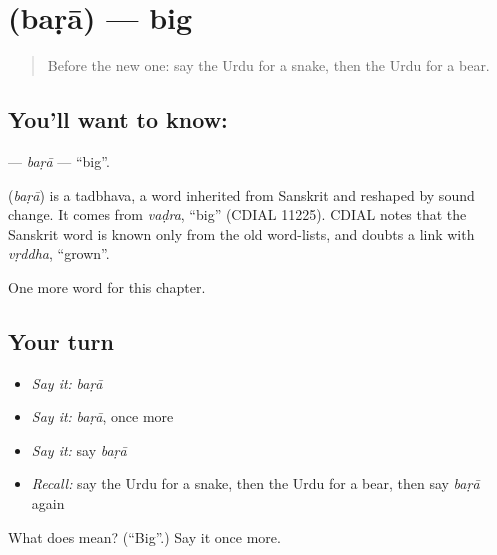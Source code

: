 \section[\texorpdfstring{\ur{بڑا} (baṛā)}{بڑا (baṛā)}]{ (baṛā) — big}

\label{lesson:UR-C69-bara}



\begin{quote}
Before the new one: say the Urdu for a snake, then the Urdu for a bear.
\end{quote}

\subsection*{You'll want to know: }
\textbf{} — \emph{baṛā} — \textquotedblleft{}big\textquotedblright{}.

\begin{cousinweb}
\textbf{} (\emph{baṛā}) is a tadbhava, a word inherited from Sanskrit and reshaped by sound change. It comes from \emph{vaḍra}, \textquotedblleft{}big\textquotedblright{} (CDIAL 11225). CDIAL notes that the Sanskrit word is known only from the old word-lists, and doubts a link with \emph{vṛddha}, \textquotedblleft{}grown\textquotedblright{}.
\end{cousinweb}

\begin{grammarlens}[title={What you've built}]
One more word for this chapter.
\end{grammarlens}

\subsection*{Your turn}
\begin{itemize}
\raggedright
  \item \emph{Say it:} \emph{baṛā}
  \item \emph{Say it:} \emph{baṛā}, once more
  \item \emph{Say it:} say \emph{baṛā}
  \item \emph{Recall:} say the Urdu for a snake, then the Urdu for a bear, then say \emph{baṛā} again
\end{itemize}

\begin{tcolorbox}[breakable,colback=teal!4,colframe=teal!35!black,title={Before you move on}]
What does  mean? (\textquotedblleft{}Big\textquotedblright{}.) Say it once more.
\end{tcolorbox}
